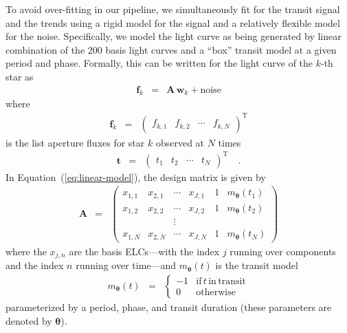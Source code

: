 \documentclass[12pt,preprint]{aastex}
\newcommand{\Eq}[1]{Equation~(\ref{eq:#1})}
\newcommand{\eq}[1]{\Eq{#1}}
\newcommand{\eqlabel}[1]{\label{eq:#1}}
\newcommand{\T}{\ensuremath{\mathrm{T}}}
\newcommand{\bvec}[1]{{\ensuremath{\boldsymbol{#1}}}}
\begin{document}
To avoid over-fitting in our pipeline, we simultaneously fit for the transit
signal and the trends using a rigid model for the signal and a relatively
flexible model for the noise.
Specifically, we model the light curve as being generated by linear
combination of the 200 basis light curves and a ``box'' transit model at a
given period and phase.
Formally, this can be written for the light curve of the $k$-th star as
\begin{eqnarray}\eqlabel{linear-model}
\bvec{f}_k &=& \bvec{A}\,\bvec{w}_k + \mathrm{noise}
\end{eqnarray}
where
\begin{eqnarray}
\bvec{f}_k &=& \left (\begin{array}{cccc}
    f_{k,1} & f_{k,2} & \cdots & f_{k,N}
\end{array}\right )^\T
\end{eqnarray}
is the list aperture fluxes for star $k$ observed at $N$ times
\begin{eqnarray}
\bvec{t} &=& \left (\begin{array}{cccc}
    t_{1} & t_{2} & \cdots & t_{N}
\end{array}\right )^\T \quad.
\end{eqnarray}
In \eq{linear-model}, the design matrix is given by
\begin{eqnarray}
\bvec{A} &=& \left (\begin{array}{cccccc}
    x_{1,1} & x_{2,1} & \cdots & x_{J,1} & 1 & m_\bvec{\theta}(t_1) \\
    x_{1,2} & x_{2,2} & \cdots & x_{J,2} & 1 & m_\bvec{\theta}(t_2) \\
    && \vdots &&&\\
    x_{1,N} & x_{2,N} & \cdots & x_{J,N} & 1 & m_\bvec{\theta}(t_N)
\end{array}\right )
\end{eqnarray}
where the $x_{j,n}$ are the basis ELCs---with the index $j$ running over
components and the index $n$ running over time---and $m_\bvec{\theta}(t)$ is
the transit model
\begin{eqnarray}
m_\bvec{\theta}(t) &=& \left\{\begin{array}{cl}
-1 & \mathrm{if\,}t\,\mathrm{in\,transit} \\
0 & \mathrm{otherwise}
\end{array}\right.
\end{eqnarray}
parameterized by a period, phase, and transit duration (these parameters are
denoted by \bvec{\theta}).
\end{document}
